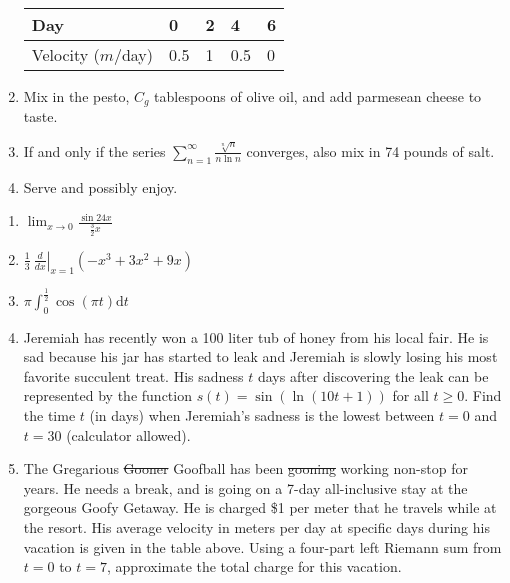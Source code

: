 \documentclass[]{article}
\begin{document}
\begin{enumerate}
	\begin{table}
		\centering
		\begin{tabular}{|l|l|l|l|l|}
			\hline
			Day              & 0 & 2 & 4   & 6 \\ \hline
			Velocity ($m$/day) & 0.5 & 1 & 0.5 & 0 \\ \hline
		\end{tabular}
	\end{table}
	
	\item Mix in the pesto, $C_g$ tablespoons of olive oil, and add parmesean cheese to taste.
	
	\item If and only if the series $\displaystyle \sum_{n=1}^\infty\frac{\sqrt[n]{n}}{n\ln n}$ converges, also mix in 74 pounds of salt.
	
	\item Serve and possibly enjoy.
\end{enumerate}

\pagebreak\noindent
\begin{enumerate}
	\item$\displaystyle \lim_{x \to 0}\frac{\sin 24x}{\frac{3}{2}x}$
	\vspace*{6cm}
	\item$\displaystyle \frac{1}{3}\:\left.\frac{d}{dx}\right|_{x=1}\left(-x^3+3x^2+9x\right)$
	\vspace*{6cm}
	\item$\displaystyle \pi\int_0^{\frac{1}{2}}\cos(\pi t)\text{d}t$
	
	\pagebreak\noindent
	
	\item Jeremiah has recently won a 100 liter tub of honey from his local fair. He is sad because his jar has started to leak and Jeremiah is slowly losing his most favorite succulent treat. His sadness $t$ days after discovering the leak can be represented by the function $\displaystyle s(t)=\sin\left(\ln\left(10t+1\right)\right)$ for all $t\geq0$. Find the time $t$ (in days) when Jeremiah's sadness is the lowest between $t=0$ and $t=30$ (calculator allowed).
	
	\vspace*{6cm}
	
	\item The Gregarious \st{Gooner} Goofball has been \st{gooning} working non-stop for years. He needs a break, and is going on a 7-day all-inclusive stay at the gorgeous Goofy Getaway. He is charged \$1 per meter that he travels while at the resort. His average velocity in meters per day at specific days during his vacation is given in the table above. Using a four-part left Riemann sum from $t=0$ to $t=7$, approximate the total charge for this vacation.
\end{enumerate}
\end{document}

